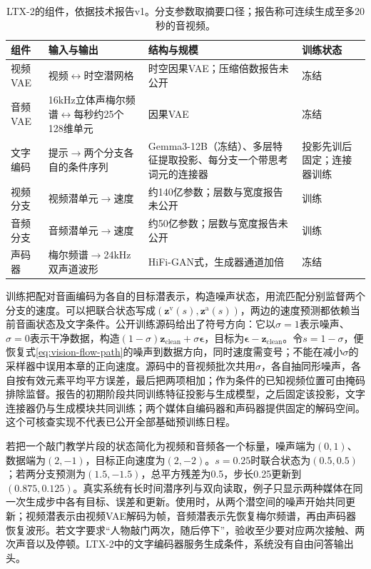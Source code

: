 \begin{table}[htbp]
  \centering
  \small
  \begin{tabularx}{\linewidth}{@{}p{14mm}XXp{14mm}@{}}
    \toprule
    组件 & 输入与输出 & 结构与规模 & 训练状态\\
    \midrule
    视频VAE & 视频$\leftrightarrow$时空潜网格 & 时空因果VAE；压缩倍数报告未公开 & 冻结\\
    音频VAE & 16kHz立体声梅尔频谱$\leftrightarrow$每秒约25个128维单元 & 因果VAE & 冻结\\
    文字编码 & 提示$\to$两个分支各自的条件序列 & Gemma3-12B（冻结）、多层特征提取投影、每分支一个带思考词元的连接器 & 投影先训后固定；连接器训练\\
    视频分支 & 视频潜单元$\to$速度 & 约140亿参数；层数与宽度报告未公开 & 训练\\
    音频分支 & 音频潜单元$\to$速度 & 约50亿参数；层数与宽度报告未公开 & 训练\\
    声码器 & 梅尔频谱$\to$24kHz双声道波形 & HiFi-GAN式，生成器通道加倍 & 冻结\\
    \bottomrule
  \end{tabularx}
  \caption{LTX-2的组件，依据技术报告v1。分支参数取摘要口径；报告称可连续生成至多20秒的音视频。}
  \label{tab:vision-models-ltx2-config}
\end{table}

训练把配对音画编码为各自的目标潜表示，构造噪声状态，用流匹配分别监督两个分支的速度。可以把联合状态写成$(\bm z^{\mathrm v}(s),\bm z^{\mathrm a}(s))$，两边的速度预测都依赖当前音画状态及文字条件。公开训练源码给出了符号方向：它以$\sigma=1$表示噪声、$\sigma=0$表示干净数据，构造$(1-\sigma)\bm z_{\mathrm{clean}}+\sigma\bm\epsilon$，目标为$\bm\epsilon-\bm z_{\mathrm{clean}}$。令$s=1-\sigma$，便恢复式\eqref{eq:vision-flow-path}的噪声到数据方向，同时速度需变号；不能在减小$\sigma$的采样器中误用本章的正向速度。源码中的音视频批次共用$\sigma$，各自抽同形噪声，各自按有效元素平均平方误差，最后把两项相加；作为条件的已知视频位置可由掩码排除监督。报告的初期阶段共同训练特征投影与生成模型，之后固定该投影，文字连接器仍与生成模块共同训练；两个媒体自编码器和声码器提供固定的解码空间。这个可核查实现不代表已公开全部基础预训练日程。

若把一个敲门教学片段的状态简化为视频和音频各一个标量，噪声端为$(0,1)$、数据端为$(2,-1)$，目标正向速度为$(2,-2)$。$s=0.25$时联合状态为$(0.5,0.5)$；若两分支预测为$(1.5,-1.5)$，总平方残差为0.5，步长0.25更新到$(0.875,0.125)$。真实系统有长时间潜序列与双向读取，例子只显示两种媒体在同一次生成步中各有目标、误差和更新。使用时，从两个潜空间的噪声开始共同更新；视频潜表示由视频VAE解码为帧，音频潜表示先恢复梅尔频谱，再由声码器恢复波形。若文字要求“人物敲门两次，随后停下”，验收至少要对应两次接触、两次声音以及停顿。LTX-2中的文字编码器服务生成条件，系统没有自由问答输出头。

